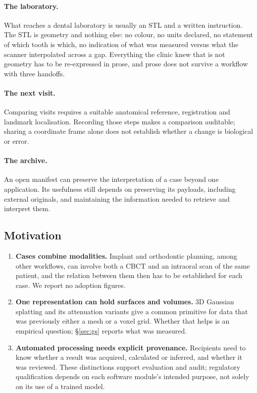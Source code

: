 \documentclass[11pt,a4paper]{article}
\begin{document}
\paragraph{The laboratory.} What reaches a dental laboratory is usually an STL and a
written instruction. The STL is geometry and nothing else: no colour, no units declared, no
statement of which tooth is which, no indication of what was measured versus what the
scanner interpolated across a gap. Everything the clinic knew that is not geometry has to
be re-expressed in prose, and prose does not survive a workflow with three handoffs.


\paragraph{The next visit.} Comparing visits requires a suitable anatomical reference,
registration and landmark localisation. Recording those steps makes a comparison auditable;
sharing a coordinate frame alone does not establish whether a change is biological or error.

\paragraph{The archive.} An open manifest can preserve the interpretation of a case beyond
one application. Its usefulness still depends on preserving its payloads, including external
originals, and maintaining the information needed to retrieve and interpret them.

\subsection{Motivation}

\begin{enumerate}
  \item \textbf{Cases combine modalities.} Implant and orthodontic planning, among other
  workflows, can involve both a CBCT and an intraoral scan of the same patient, and the
  relation between them then has to be established for each case. We report no adoption
  figures.

  \item \textbf{One representation can hold surfaces and volumes.} 3D Gaussian splatting
  \cite{kerbl2023} and its attenuation variants \cite{xgaussian,r2gaussian} give a common
  primitive for data that was previously either a mesh or a voxel grid. Whether that helps is
  an empirical question; \S\ref{sec:gs} reports what was measured.

  \item \textbf{Automated processing needs explicit provenance.} Recipients need to know
  whether a result was acquired, calculated or inferred, and whether it was reviewed.
  These distinctions support evaluation and audit; regulatory qualification depends on
  each software module's intended purpose, not solely on its use of a trained model.

\end{enumerate}
\end{document}
